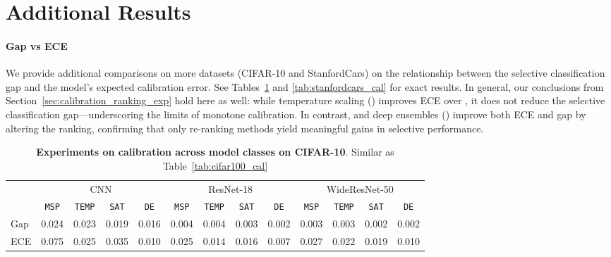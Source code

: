 \section{Additional Results}

\paragraph{Gap vs ECE} We provide additional comparisons on more datasets (CIFAR-10 and StanfordCars) on the relationship between the selective classification gap and the model's expected calibration error. See Tables~\ref{tab:cifar10_cal} and \ref{tab:stanfordcars_cal} for exact results. In general, our conclusions from Section~\ref{sec:calibration_ranking_exp} hold here as well: while temperature scaling (\temp) improves ECE over \msp, it does not reduce the selective classification gap—underscoring the limits of monotone calibration. In contrast, \sat and deep ensembles (\de) improve both ECE and gap by altering the ranking, confirming that only re-ranking methods yield meaningful gains in selective performance.

\begin{table}[h]
\fontsize{9}{10}\selectfont
\setlength{\tabcolsep}{5pt}
\caption{\textbf{Experiments on calibration across model classes on CIFAR-10}. Similar as Table~\ref{tab:cifar100_cal}}
\vspace{5pt}
\label{tab:cifar10_cal}
\centering
\begin{tabular}{lcccccccccccc}
\toprule
 & \multicolumn{4}{c}{CNN} & \multicolumn{4}{c}{ResNet-18} & \multicolumn{4}{c}{WideResNet-50} \\
\cmidrule(r){2-5} \cmidrule(r){6-9} \cmidrule(r){10-13}
 & \texttt{MSP} & \texttt{TEMP} & \texttt{SAT} & \texttt{DE} & \texttt{MSP} & \texttt{TEMP} & \texttt{SAT} & \texttt{DE} & \texttt{MSP} & \texttt{TEMP} & \texttt{SAT} & \texttt{DE} \\
\midrule
Gap & 0.024 & 0.023 & 0.019 & 0.016 & 0.004 & 0.004 & 0.003 & 0.002 & 0.003 & 0.003 & 0.002 & 0.002 \\
ECE & 0.075 & 0.025 & 0.035 & 0.010 & 0.025 & 0.014 & 0.016 & 0.007 & 0.027 & 0.022 & 0.019 & 0.010 \\
\bottomrule
\end{tabular}
\end{table}

